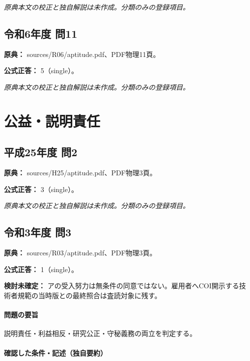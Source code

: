 \par\textit{原典本文の校正と独自解説は未作成。分類のみの登録項目。}

\subsection{令和6年度 問11}
\label{q:r06-reg-apt-11}

\noindent\textbf{原典：} sources/R06/aptitude.pdf、PDF物理11頁。

\textbf{公式正答：} 5（single）。

\par\textit{原典本文の校正と独自解説は未作成。分類のみの登録項目。}

\section{公益・説明責任}

\subsection{平成25年度 問2}
\label{q:h25-reg-apt-02}

\noindent\textbf{原典：} sources/H25/aptitude.pdf、PDF物理3頁。

\textbf{公式正答：} 3（single）。

\par\textit{原典本文の校正と独自解説は未作成。分類のみの登録項目。}

\subsection{令和3年度 問3}
\label{q:r03-reg-apt-03}

\noindent\textbf{原典：} sources/R03/aptitude.pdf、PDF物理3頁。

\textbf{公式正答：} 1（single）。

\par\textbf{検討未確定：} アの受入努力は無条件の同意ではない。雇用者へCOI開示する技術者規範の当時版との最終照合は査読対象に残す。

\paragraph{問題の要旨} 説明責任・利益相反・研究公正・守秘義務の両立を判定する。

\paragraph{確認した条件・記述（独自要約）}\mbox{}\par

